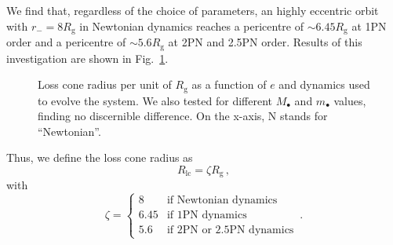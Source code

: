 \documentclass[desactivate]{aa}
\begin{document}
        We find that, regardless of the choice of parameters, an highly eccentric orbit with $r_-=8 R_\mathrm{g}$ in Newtonian dynamics reaches a pericentre of ${\sim}6.45 R_\mathrm{g}$ at 1PN order and a pericentre of ${\sim}5.6 R_\mathrm{g}$ at 2PN and 2.5PN order. Results of this investigation are shown in Fig.\ \ref{fig:losscone}.
        \begin{figure}
            \centering
            \caption{Loss cone radius per unit of $R_\mathrm{g}$ as a function of $e$ and dynamics used to evolve the system. We also tested for different $M_\bullet$ and $m_\bullet$ values, finding no discernible difference. On the x-axis, N stands for ``Newtonian''.}
            \label{fig:losscone}
        \end{figure}         
        Thus, we define the loss cone radius as
        \begin{equation} \label{eq:R_lc}
                R_\mathrm{lc} = \zeta R_\mathrm{g} \, ,
        \end{equation}
        with
        \begin{equation}
            \zeta = 
                \begin{cases}
                    8 & \text{if Newtonian dynamics} \\
                    6.45 & \text{if 1PN dynamics} \\
                    5.6 & \text{if 2PN or 2.5PN dynamics}
                \end{cases} \, .
        \end{equation}
\end{document}

